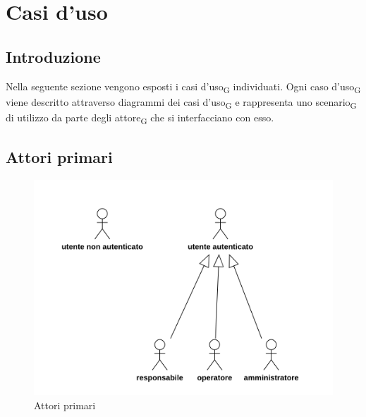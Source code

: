 \section{Casi d'uso}
\subsection{Introduzione}
Nella seguente sezione vengono esposti i casi d'uso\textsubscript{G} individuati. Ogni caso d'uso\textsubscript{G} viene descritto attraverso diagrammi dei casi d'uso\textsubscript{G} e rappresenta uno scenario\textsubscript{G} di utilizzo da parte degli attore\textsubscript{G} che si interfacciano con esso.
\subsection{Attori primari}
\begin{figure}[H]
	\centering
	\includegraphics[scale=0.52]{res/images/gerarchia.png}
	\caption{Attori primari}
\end{figure}
